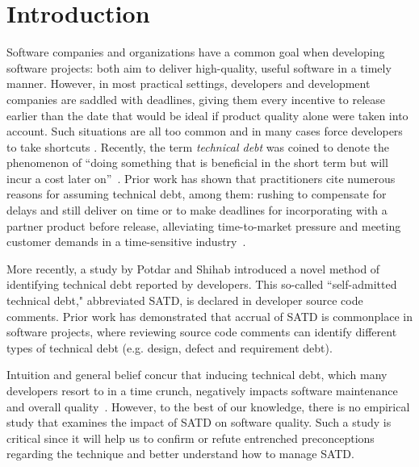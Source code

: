 
\section{Introduction}
\label{chap3:sec:introduction}
Software companies and organizations have a common goal when developing software projects: both aim to deliver high-quality, useful software in a timely manner. However, in most practical settings, developers and development companies are saddled with deadlines, giving them every incentive to release earlier than the date that would be ideal if product quality alone were taken into account. Such situations are all too common and in many cases force developers to take shortcuts \cite{kruchten2013technical} \cite{seaman2015technical}. Recently, the term \emph{technical debt} was coined to denote the phenomenon of ``doing something that is beneficial in the short term but will incur a cost later on''~\cite{cunningham1993wycash}. Prior work has shown that practitioners cite numerous reasons for assuming technical debt, among them: rushing to compensate for delays and still deliver on time or to make deadlines for incorporating with a partner product before release, alleviating time-to-market pressure and meeting customer demands in a time-sensitive industry~\cite{lim2012balancing}.


More recently, a study by Potdar and Shihab \cite{ICSM_PotdarS14} introduced a novel method of identifying technical debt reported by developers. This so-called ``self-admitted technical debt," abbreviated SATD, is declared in developer source code comments. Prior work \cite{MTD15p9} has demonstrated that accrual of SATD is commonplace in software projects, where reviewing source code comments can identify different types of technical debt (e.g. design, defect and requirement debt).

Intuition and general belief concur that inducing technical debt, which many developers resort to in a time crunch, negatively impacts software maintenance and overall quality~\cite{zazworka2011investigating,spinola2013investigating,GuoSGCTSSS11,seaman2015technical,kruchten2013technical}. However, to the best of our knowledge, there is no empirical study that examines the impact of SATD on software quality. Such a study is critical since it will help us to confirm or refute entrenched preconceptions regarding the technique and better understand how to manage SATD.


